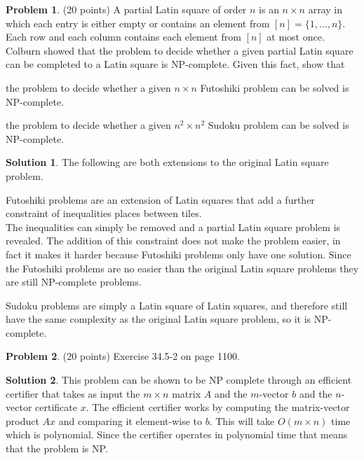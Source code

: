 \documentclass{article}
\theoremstyle{definition}
\newtheorem{problem}{Problem}
\newtheorem*{solution}{Solution}
\begin{document}
\begin{problem} (20 points)
A partial Latin square of order $n$ is an $n\times n$ array in which
each entry is either empty or contains an element from $[n] = \{1,\ldots,
n\}$. Each row and each column contains each element from $[n]$ at
most once. Colburn showed that the problem to decide whether a given
partial Latin square can be completed to a Latin square is
NP-complete. Given this fact, show that 
\begin{compactenum}[(a)]
\item the problem to decide whether a given $n\times n$ Futoshiki
  problem can be solved is NP-complete. 
\item the problem to decide whether a given $n^2\times n^2$ Sudoku 
  problem can be solved is NP-complete. 
\end{compactenum}
\end{problem}
\begin{solution} The following are both extensions to the original Latin square problem.
\begin{compactenum}[(a)]
\item Futoshiki problems are an extension of Latin squares that add a further constraint of inequalities places between tiles.\\
    The inequalities can simply be removed and a partial Latin square problem is revealed. The addition of this constraint does not make the problem easier, in fact it makes it harder because Futoshiki problems only have one solution. Since the Futoshiki problems are no easier than the original Latin square problems they are still NP-complete problems.
\item Sudoku problems are simply a Latin square of Latin squares, and therefore still have the same complexity as the original Latin square problem, so it is NP-complete.
\end{compactenum}
\end{solution}

\begin{problem} (20 points) %
Exercise 34.5-2 on page 1100. 
\end{problem}
\begin{solution}
This problem can be shown to be NP complete through an efficient certifier that takes as input the $m \times n$ matrix $A$ and the $m$-vector $b$ and the $n$-vector certificate $x$. The efficient certifier works by computing the matrix-vector product $Ax$ and comparing it element-wise to $b$. This will take $O(m \times n)$ time which is polynomial. Since the certifier operates in polynomial time that means that the problem is NP.
\end{solution}
\end{document}
